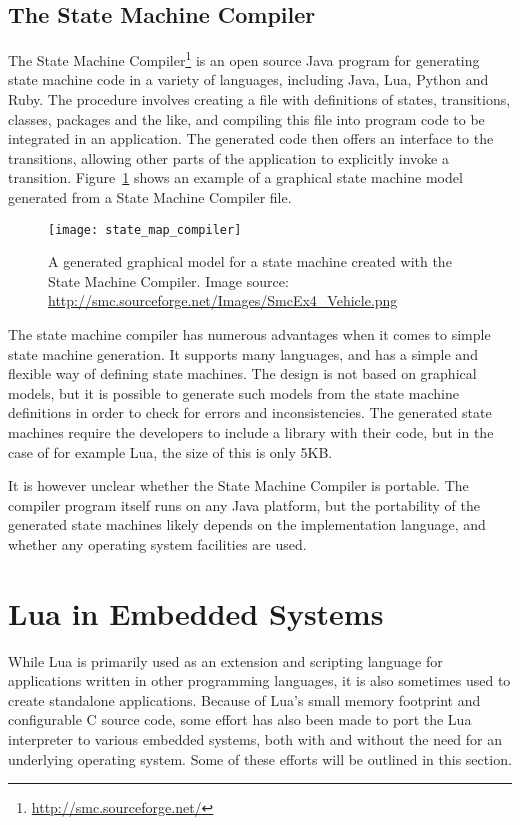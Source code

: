 \subsection{The State Machine Compiler}
\label{sec:state_machine_compiler}
The State Machine Compiler\footnote{\url{http://smc.sourceforge.net/}} is an open source Java program for generating state machine code in a variety of languages, including Java, Lua, Python and Ruby. The procedure involves creating a file with definitions of states, transitions, classes, packages and the like, and compiling this file into program code to be integrated in an application. The generated code then offers an interface to the transitions, allowing other parts of the application to explicitly invoke a transition. Figure~\ref{fig:state_map_compiler} shows an example of a graphical state machine model generated from a State Machine Compiler file.

\begin{figure}[htp]
	\centering
	\texttt{[image: state\_map\_compiler]}
	\caption[A state machine created with the State Machine Compiler]{A generated graphical model for a state machine created with the State Machine Compiler. Image source: \url{http://smc.sourceforge.net/Images/SmcEx4_Vehicle.png}} \label{fig:state_map_compiler}
\end{figure}

\noindent
The state machine compiler has numerous advantages when it comes to simple state machine generation. It supports many languages, and has a simple and flexible way of defining state machines. The design is not based on graphical models, but it is possible to generate such models from the state machine definitions in order to check for errors and inconsistencies. The generated state machines require the developers to include a library with their code, but in the case of for example Lua, the size of this is only 5KB.

\noindent
It is however unclear whether the State Machine Compiler is portable. The compiler program itself runs on any Java platform, but the portability of the generated state machines likely depends on the implementation language, and whether any operating system facilities are used.

\section{Lua in Embedded Systems}
\label{sec:lua_in_embedded}
While Lua is primarily used as an extension and scripting language for applications written in other programming languages, it is also sometimes used to create standalone applications. Because of Lua's small memory footprint and configurable C source code, some effort has also been made to port the Lua interpreter to various embedded systems, both with and without the need for an underlying operating system. Some of these efforts will be outlined in this section.

